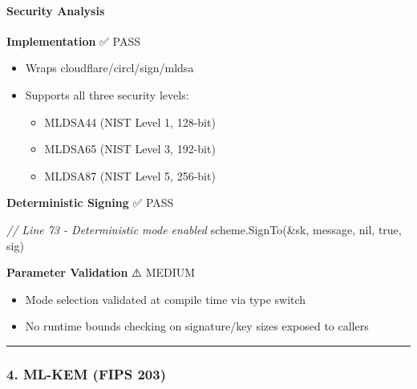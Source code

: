 \documentclass[
]{article}
\newenvironment{Shaded}{}{}
\newcommand{\CommentTok}[1]{\textcolor[rgb]{0.38,0.63,0.69}{\textit{#1}}}
\newcommand{\NormalTok}[1]{#1}
\newcommand{\OperatorTok}[1]{\textcolor[rgb]{0.40,0.40,0.40}{#1}}
\newcommand{\OtherTok}[1]{\textcolor[rgb]{0.00,0.44,0.13}{#1}}
\providecommand{\tightlist}{%
  \setlength{\itemsep}{0pt}\setlength{\parskip}{0pt}}
\begin{document}
\paragraph{Security Analysis}\label{security-analysis-2}

\textbf{Implementation} ✅ PASS

\begin{itemize}
\tightlist
\item
  Wraps cloudflare/circl/sign/mldsa
\item
  Supports all three security levels:

  \begin{itemize}
  \tightlist
  \item
    MLDSA44 (NIST Level 1, 128-bit)
  \item
    MLDSA65 (NIST Level 3, 192-bit)
  \item
    MLDSA87 (NIST Level 5, 256-bit)
  \end{itemize}
\end{itemize}

\textbf{Deterministic Signing} ✅ PASS

\begin{Shaded}
\begin{Highlighting}[]
\CommentTok{// Line 73 {-} Deterministic mode enabled}
\NormalTok{scheme}\OperatorTok{.}\NormalTok{SignTo}\OperatorTok{(\&}\NormalTok{sk}\OperatorTok{,}\NormalTok{ message}\OperatorTok{,} \OtherTok{nil}\OperatorTok{,} \OtherTok{true}\OperatorTok{,}\NormalTok{ sig}\OperatorTok{)}
\end{Highlighting}
\end{Shaded}

\textbf{Parameter Validation} ⚠️ MEDIUM

\begin{itemize}
\tightlist
\item
  Mode selection validated at compile time via type switch
\item
  No runtime bounds checking on signature/key sizes exposed to callers
\end{itemize}

\begin{center}\rule{0.5\linewidth}{0.5pt}\end{center}

\subsubsection{4. ML-KEM (FIPS 203)}\label{4-ml-kem-fips-203}
\end{document}
